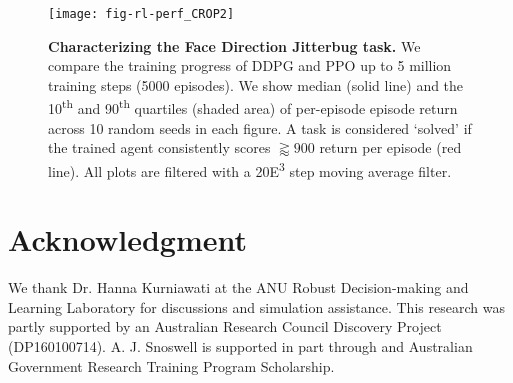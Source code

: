 \documentclass[letterpaper, 10 pt, conference]{ieeeconf}
\begin{document}

\begin{figure}[h]
    \vspace*{-6pt}
    \centering
    \texttt{[image: fig-rl-perf\_CROP2]}

        \caption{
        \textbf{Characterizing the Face Direction Jitterbug task.}
        We compare the training progress of DDPG and PPO up to 5 million training steps (5000 episodes).
        We show median (solid line) and the 10\textsuperscript{th} and 90\textsuperscript{th} quartiles (shaded area) of per-episode episode return across 10 random seeds in each figure.
        A task is considered `solved' if the trained agent consistently scores $\gtrapprox 900$ return per episode (red line).
        All plots are filtered with a 20{\tiny E}\textsuperscript{3} step moving average filter.
    }
\vspace*{-25pt}
    
    
    \label{fig:rl-perf}
\end{figure}

\vspace*{-6pt}


\section*{Acknowledgment}

We thank Dr. Hanna Kurniawati at the ANU Robust Decision-making and Learning Laboratory for discussions and simulation assistance.
This research was partly supported by an Australian Research Council Discovery Project (DP160100714).
A. J. Snoswell is supported in part through and Australian Government Research Training Program Scholarship. 




\end{document}
